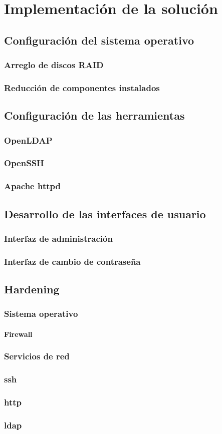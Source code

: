   \label{chap:cap3}
  \chapter {Implementaci\'{o}n de la soluci\'{o}n}
    \section {Configuraci\'{o}n del sistema operativo}
      \subsection {Arreglo de discos RAID}
      \subsection {Reducci\'{o}n de componentes instalados}
    \section {Configuraci\'{o}n de las herramientas}
      \subsection {OpenLDAP}
      \subsection {OpenSSH}
      \subsection {Apache httpd}
    \section {Desarrollo de las interfaces de usuario}
      \subsection {Interfaz de administraci\'{o}n}
      \subsection {Interfaz de cambio de contrase\~{n}a}
    \section {Hardening}
      \subsection {Sistema operativo}
        \subsubsection {Firewall}
      \subsection {Servicios de red}
        \subsection {ssh}
        \subsection {http}
        \subsection {ldap}
